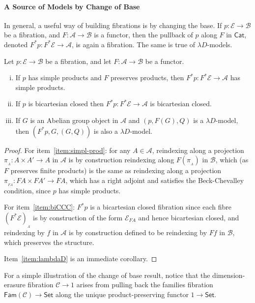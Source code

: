 \documentclass[a4paper,UKenglish]{lipics}
\theoremstyle{plain}
\newcommand{\ra}{\rightarrow}
\newcommand{\msf}[1]{\mathsf{#1}} %
\newcommand{\Set}{\msf{Set}}
\newcommand{\Cat}{\msf{Cat}}
\newcommand{\Fam}[1]{\msf{Fam}(#1)}
\newcommand{\A}{\mathcal{A}}
\newcommand{\B}{\mathcal{B}}
\newcommand{\C}{\mathcal{C}}
\newcommand{\E}{\mathcal{E}}
\newcommand{\fibre}[2]{#1_{_{#2}}}
\newcommand{\fibreE}[1]{\E_{#1}}
\begin{document}
\paragraph*{A Source of Models by Change of Base}
\label{sec:change-of-base}
In general, a useful way of building fibrations is by changing the base. If $p:\E\ra \B$ be a fibration, and $F:\A\ra \B$ is a functor, then the pullback of $p$ along $F$ in $\Cat$, denoted $F^\ast p : F^\ast \E \rightarrow \A$, is again a fibration. The same is true of $\lambda D$-models.
\begin{theorem}
\label{thm:change-of-base}
Let $p:\E\ra \B$ be a fibration, and let $F:\A\ra \B$ be a functor.
\begin{enumerate}[(i)]
\item If $p$ has simple products and $F$ preserves products,
then $F^\ast p : F^\ast \E \rightarrow \A$ has simple products.
\label{item:simpl-prod}
\item If $p$ is bicartesian closed then $F^\ast p: F^\ast \E \rightarrow \A$
is bicartesian closed.
\label{item:biCCC}
\item If $G$ is an Abelian group object in $\A$ and
  $(p,F(G),Q)$ is a $\lambda D$-model,
  then $(F^\ast p,G,(G, Q))$ is also a $\lambda D$-model.
\label{item:lambdaD}
\end{enumerate}
\end{theorem}
\begin{proof}
For item~\eqref{item:simpl-prod}: for any $A \in \A$, reindexing along a projection $\pi_{_{A}}: A \times A' \rightarrow A$ in $\A$ is by construction reindexing along $F(\pi_{_{A}})$ in $\B$, which (as $F$ preserves finite products) is the same as reindexing along a projection $\pi_{_{FA}} : FA \times FA' \rightarrow FA$, which has a right adjoint and satisfies the Beck-Chevalley condition, since $p$ has simple products.

For item~\eqref{item:biCCC}: $F^*p$ is a bicartesian closed fibration since each fibre $\fibre{(F^*\E)}{A}$ is by construction of the form $\fibreE{FA}$ and hence bicartesian closed, and reindexing by $f$ in $\A$ is by construction defined to be reindexing by $Ff$ in $\B$, which preserves the structure.

Item~\eqref{item:lambdaD} is an immediate corollary.
\end{proof}


For a simple illustration of the change of base result, notice that the dimension-erasure fibration $\C\to 1$ arises from pulling back the families fibration $\Fam\C\to\Set$ along the unique product-preserving functor $1\to\Set$.
\end{document}
